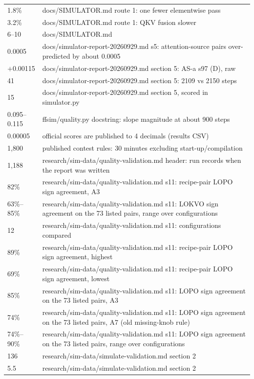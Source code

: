 \begin{longtable}{@{}p{3.6cm}p{12.0cm}@{}}
1.8\% & docs/SIMULATOR.md route 1: one fewer elementwise pass \\
3.2\% & docs/SIMULATOR.md route 1: QKV fusion slower \\
6--10 & docs/SIMULATOR.md \\
0.0005 & docs/simulator-report-20260929.md s5: attention-source pairs over-predicted by about 0.0005 \\
\ensuremath{+}0.00115 & docs/simulator-report-20260929.md section 5: AS-a s97 (D), raw \\
41 & docs/simulator-report-20260929.md section 5: 2109 vs 2150 steps \\
15 & docs/simulator-report-20260929.md section 5, scored in simulator.py \\
0.095--0.115 & ffsim/quality.py docstring: slope magnitude at about 900 steps \\
0.00005 & official scores are published to 4 decimals (results CSV) \\
1{,}800 & published contest rules: 30 minutes excluding start-up/compilation \\
1{,}188 & research/sim-data/quality-validation.md header: run records when the report was written \\
82\% & research/sim-data/quality-validation.md s11: recipe-pair LOPO sign agreement, A3 \\
63\%--85\% & research/sim-data/quality-validation.md s11: LOKVO sign agreement on the 73 listed pairs, range over configurations \\
12 & research/sim-data/quality-validation.md s11: configurations compared \\
89\% & research/sim-data/quality-validation.md s11: recipe-pair LOPO sign agreement, highest \\
69\% & research/sim-data/quality-validation.md s11: recipe-pair LOPO sign agreement, lowest \\
85\% & research/sim-data/quality-validation.md s11: LOPO sign agreement on the 73 listed pairs, A3 \\
74\% & research/sim-data/quality-validation.md s11: LOPO sign agreement on the 73 listed pairs, A7 (old missing-knob rule) \\
74\%--90\% & research/sim-data/quality-validation.md s11: LOPO sign agreement on the 73 listed pairs, range over configurations \\
136 & research/sim-data/simulate-validation.md section 2 \\
5.5 & research/sim-data/simulate-validation.md section 2 \\
\end{longtable}
